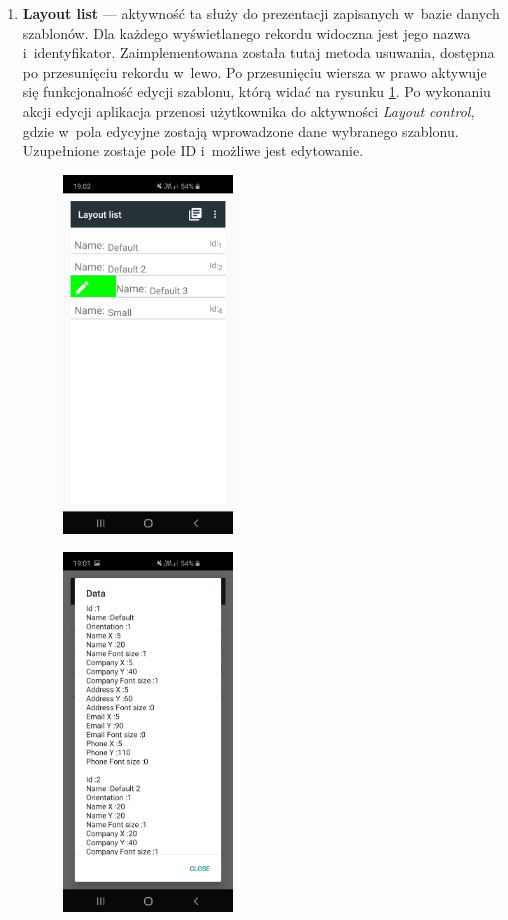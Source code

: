 \documentclass[a4paper,12pt, twoside]{article}
\begin{document}
\begin{enumerate}
           \item \textbf{Layout list} — aktywność ta służy do prezentacji zapisanych w~bazie danych szablonów. Dla każdego wyświetlanego rekordu widoczna jest jego nazwa i~identyfikator. Zaimplementowana została tutaj metoda usuwania, dostępna po przesunięciu rekordu w~lewo. Po przesunięciu wiersza w prawo aktywuje się funkcjonalność edycji szablonu, którą widać na rysunku \ref{fig:layoutlist}. Po wykonaniu akcji edycji aplikacja przenosi użytkownika do aktywności \textit{Layout control}, gdzie w~pola edycyjne zostają wprowadzone dane wybranego szablonu. Uzupełnione zostaje pole ID i~możliwe jest edytowanie. 
           \begin{figure}[H]
    	        \centering
    	        \begin{minipage}{.5\textwidth}
                    \centering
    	            \includegraphics[width=4.5cm]{images/view_layoutList.jpg}
                    \label{fig:layoutlist}
                \end{minipage}%
    	        \begin{minipage}{.5\textwidth}
    	            \centering
    	            \includegraphics[width=4.5cm]{images/view_layoutDetails.jpg}

\end{minipage}
\end{figure}
\end{enumerate}
\end{document}
